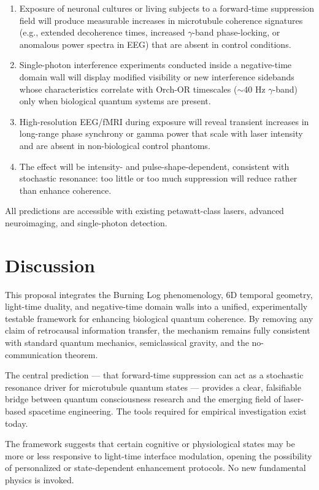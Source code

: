 \documentclass[11pt,a4paper]{article}
\begin{document}
\begin{enumerate}
    \item Exposure of neuronal cultures or living subjects to a forward-time suppression field will produce measurable increases in microtubule coherence signatures (e.g., extended decoherence times, increased $\gamma$-band phase-locking, or anomalous power spectra in EEG) that are absent in control conditions.
    \item Single-photon interference experiments conducted inside a negative-time domain wall will display modified visibility or new interference sidebands whose characteristics correlate with Orch-OR timescales ($\sim$40 Hz $\gamma$-band) only when biological quantum systems are present.
    \item High-resolution EEG/fMRI during exposure will reveal transient increases in long-range phase synchrony or gamma power that scale with laser intensity and are absent in non-biological control phantoms.
    \item The effect will be intensity- and pulse-shape-dependent, consistent with stochastic resonance: too little or too much suppression will reduce rather than enhance coherence.
\end{enumerate}

All predictions are accessible with existing petawatt-class lasers, advanced neuroimaging, and single-photon detection.

\section{Discussion}

This proposal integrates the Burning Log phenomenology, 6D temporal geometry, light-time duality, and negative-time domain walls into a unified, experimentally testable framework for enhancing biological quantum coherence. By removing any claim of retrocausal information transfer, the mechanism remains fully consistent with standard quantum mechanics, semiclassical gravity, and the no-communication theorem.

The central prediction — that forward-time suppression can act as a stochastic resonance driver for microtubule quantum states — provides a clear, falsifiable bridge between quantum consciousness research and the emerging field of laser-based spacetime engineering. The tools required for empirical investigation exist today.

The framework suggests that certain cognitive or physiological states may be more or less responsive to light-time interface modulation, opening the possibility of personalized or state-dependent enhancement protocols. No new fundamental physics is invoked.
\end{document}
